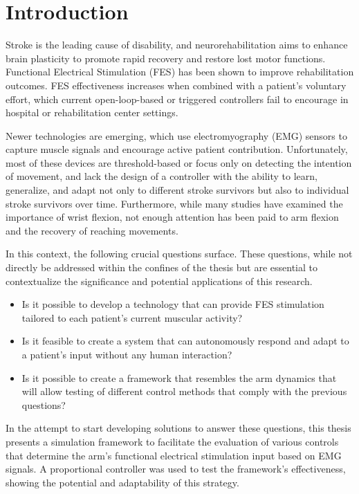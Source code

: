 \chapter{Introduction}

Stroke is the leading cause of disability, and neurorehabilitation aims to enhance brain plasticity to promote rapid recovery and restore lost motor functions. Functional Electrical Stimulation (FES) has been shown to improve rehabilitation outcomes. FES effectiveness increases when combined with a patient's voluntary effort, which current open-loop-based or triggered controllers fail to encourage in hospital or rehabilitation center settings.

Newer technologies are emerging, which use electromyography (EMG) sensors to capture muscle signals and encourage active patient contribution. Unfortunately, most of these devices are threshold-based or focus only on detecting the intention of movement, and lack the design of a controller with the ability to learn, generalize, and adapt not only to different stroke survivors but also to individual stroke survivors over time. Furthermore, while many studies have examined the importance of wrist flexion, not enough attention has been paid to arm flexion and the recovery of reaching movements.

In this context, the following crucial questions surface. These questions, while not directly be addressed within the confines of the thesis but are essential to contextualize the significance and potential applications of this research. 

\begin{itemize}
    \item Is it possible to develop a technology that can provide FES stimulation tailored to each patient's current muscular activity?
    \item Is it feasible to create a system that can autonomously respond and adapt to a patient's input without any human interaction?
    \item Is it possible to create a framework that resembles the arm dynamics that will allow testing of different control methods that comply with the previous questions?
\end{itemize}

In the attempt to start developing solutions to answer these questions, this thesis presents a simulation framework to facilitate the evaluation of various controls that determine the arm's functional electrical stimulation input based on EMG signals. A proportional controller was used to test the framework's effectiveness, showing the potential and adaptability of this strategy. 

